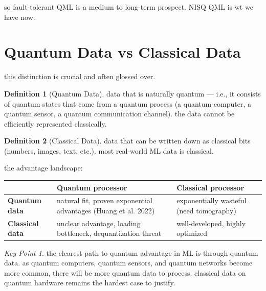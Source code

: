 \documentclass[11pt,a4paper]{article}
\theoremstyle{definition}
\newtheorem{definition}{Definition}[section]
\theoremstyle{remark}
\newtheorem*{keypoint}{Key Point}
\begin{document}
so fault-tolerant QML is a medium to long-term prospect. NISQ QML is wt we have now.

\section{Quantum Data vs Classical Data}

this distinction is crucial and often glossed over.

\begin{definition}[Quantum Data]
data that is naturally quantum --- i.e., it consists of quantum states that come from a quantum process (a quantum computer, a quantum sensor, a quantum communication channel). the data cannot be efficiently represented classically.
\end{definition}

\begin{definition}[Classical Data]
data that can be written down as classical bits (numbers, images, text, etc.). most real-world ML data is classical.
\end{definition}

the advantage landscape:

\begin{center}
\renewcommand{\arraystretch}{1.4}
\begin{tabular}{|p{4cm}|p{4.5cm}|p{4.5cm}|}
\hline
 & \textbf{Quantum processor} & \textbf{Classical processor} \\
\hline
\textbf{Quantum data} & natural fit, proven exponential advantages (Huang et al. 2022) & exponentially wasteful (need tomography) \\
\hline
\textbf{Classical data} & unclear advantage, loading bottleneck, dequantization threat & well-developed, highly optimized \\
\hline
\end{tabular}
\end{center}

\begin{keypoint}
the clearest path to quantum advantage in ML is through quantum data. as quantum computers, quantum sensors, and quantum networks become more common, there will be more quantum data to process. classical data on quantum hardware remains the hardest case to justify.
\end{keypoint}

\end{document}
